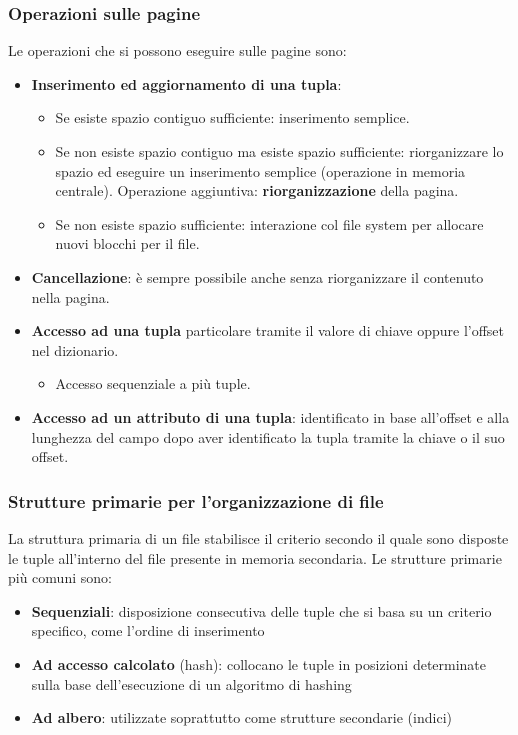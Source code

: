 \documentclass[a4paper,twoside]{article}
\begin{document}
\subsubsection{Operazioni sulle pagine}
Le operazioni che si possono eseguire sulle pagine sono:
\begin{itemize}
  \item \textbf{Inserimento ed aggiornamento di una tupla}:
    \begin{itemize}
      \item Se esiste spazio contiguo sufficiente: inserimento semplice.

      \item Se non esiste spazio contiguo ma esiste spazio sufficiente: riorganizzare lo
        spazio ed eseguire un inserimento semplice (operazione in memoria centrale).
        Operazione aggiuntiva: \textbf{riorganizzazione} della pagina.

      \item Se non esiste spazio sufficiente: interazione col file system per allocare
        nuovi blocchi per il file.
    \end{itemize}

  \item \textbf{Cancellazione}: è sempre possibile anche senza riorganizzare il
    contenuto nella pagina.

  \item \textbf{Accesso ad una tupla} particolare tramite il valore di chiave oppure
    l’offset nel dizionario.
    \begin{itemize}
      \item Accesso sequenziale a più tuple.
    \end{itemize}

  \item \textbf{Accesso ad un attributo di una tupla}: identificato in base all’offset
    e alla lunghezza del campo dopo aver identificato la tupla tramite la chiave o il
    suo offset.
\end{itemize}

\subsubsection{Strutture primarie per l'organizzazione di file}
La struttura primaria di un file stabilisce il criterio secondo il quale sono disposte
le tuple all'interno del file presente in memoria secondaria. Le strutture primarie più
comuni sono:
\begin{itemize}
  \item \textbf{Sequenziali}: disposizione consecutiva delle tuple che si basa su un
    criterio specifico, come l'ordine di inserimento

  \item \textbf{Ad accesso calcolato} (hash): collocano le tuple in posizioni
    determinate sulla base dell'esecuzione di un algoritmo di hashing

  \item \textbf{Ad albero}: utilizzate soprattutto come strutture secondarie (indici)
\end{itemize}
\end{document}

